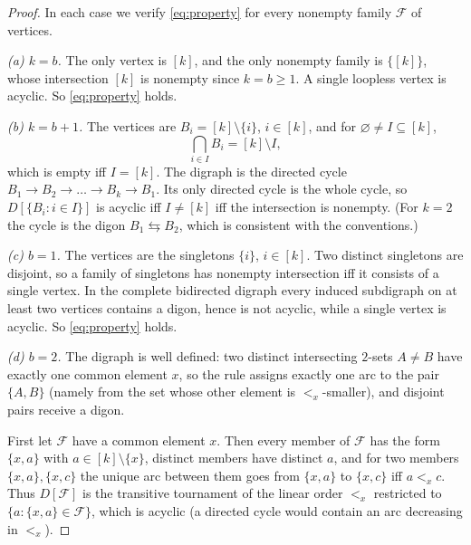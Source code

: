 \documentclass[11pt,a4paper]{article}
\theoremstyle{plain}
\theoremstyle{definition}
\theoremstyle{remark}
\newcommand{\cF}{\mathcal F}
\begin{document}
\label{pf:pos}
\proppos*
\begin{proof}
In each case we verify \eqref{eq:property} for every nonempty family $\cF$ of vertices.

\emph{(a) $k=b$.} The only vertex is $[k]$, and the only nonempty family is $\{[k]\}$, whose intersection $[k]$ is nonempty since $k=b\ge1$. A single loopless vertex is acyclic. So \eqref{eq:property} holds.

\emph{(b) $k=b+1$.} The vertices are $B_i=[k]\setminus\{i\}$, $i\in[k]$, and for $\varnothing\ne I\subseteq[k]$,
\[
 \bigcap_{i\in I}B_i=[k]\setminus I,
\]
which is empty iff $I=[k]$. The digraph is the directed cycle $B_1\to B_2\to\dots\to B_k\to B_1$. Its only directed cycle is the whole cycle, so $D[\{B_i:i\in I\}]$ is acyclic iff $I\ne[k]$ iff the intersection is nonempty. (For $k=2$ the cycle is the digon $B_1\leftrightarrows B_2$, which is consistent with the conventions.)

\emph{(c) $b=1$.} The vertices are the singletons $\{i\}$, $i\in[k]$. Two distinct singletons are disjoint, so a family of singletons has nonempty intersection iff it consists of a single vertex. In the complete bidirected digraph every induced subdigraph on at least two vertices contains a digon, hence is not acyclic, while a single vertex is acyclic. So \eqref{eq:property} holds.

\emph{(d) $b=2$.} The digraph is well defined: two distinct intersecting $2$-sets $A\ne B$ have exactly one common element $x$, so the rule assigns exactly one arc to the pair $\{A,B\}$ (namely from the set whose other element is $<_x$-smaller), and disjoint pairs receive a digon.

First let $\cF$ have a common element $x$. Then every member of $\cF$ has the form $\{x,a\}$ with $a\in[k]\setminus\{x\}$, distinct members have distinct $a$, and for two members $\{x,a\},\{x,c\}$ the unique arc between them goes from $\{x,a\}$ to $\{x,c\}$ iff $a<_x c$. Thus $D[\cF]$ is the transitive tournament of the linear order $<_x$ restricted to $\{a:\{x,a\}\in\cF\}$, which is acyclic (a directed cycle would contain an arc decreasing in $<_x$).


\end{proof}
\end{document}

